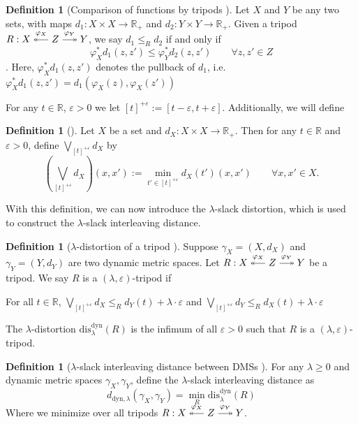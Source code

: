 \documentclass[a4paper,UKenglish,thm-restate]{article}
\theoremstyle{definition}
\newtheorem{definition}[theorem]{Definition}
\DeclareRobustCommand\longtwoheadrightarrow
     {\relbar\joinrel\twoheadrightarrow}
\DeclareRobustCommand\longtwoheadleftarrow
     {\twoheadleftarrow\joinrel\relbar}
\begin{document}
\begin{appendices}
        \begin{definition}[Comparison of functions by tripods \cite{stablesignatures}]
            Let $X$ and $Y$ be any two sets, with maps $d_1: X \times X \rightarrow \mathbb{R}_{+}$ and $d_2: Y \times Y \rightarrow \mathbb{R}_{+}$. Given a tripod $R: X \overset{\varphi_X}{\longtwoheadleftarrow} Z \overset{\varphi_Y}{\longtwoheadrightarrow} Y$, we say $d_1 \leq_{R} d_2$ if and only if \[\varphi_X^{*} d_1(z, z') \leq \varphi_Y^{*} d_2(z, z') \qquad \forall z, z' \in Z\]. Here, $\varphi_X^{*} d_1(z, z')$ denotes the pullback of $d_1$, i.e. $\varphi_X^{*} d_1(z, z') = d_1(\varphi_X(z), \varphi_X(z'))$
        \end{definition}
        For any $t \in \mathbb{R}$, $\varepsilon > 0$ we let $[t]^{+\varepsilon} := [t - \varepsilon, t + \varepsilon]$. Additionally, we will define
        \begin{definition}[\cite{stablesignatures}]
            Let $X$ be a set and $d_X: X \times X \rightarrow \mathbb{R}_+$. Then for any $t \in \mathbb{R}$ and $\varepsilon > 0$, define $\bigvee_{[t]^{+\varepsilon}} d_X$ by \[\left(\bigvee_{[t]^{+\varepsilon}} d_X\right)(x, x') := \min_{t' \in [t]^{+\varepsilon}} d_X(t')(x, x') \qquad \forall x, x' \in X.\]
        \end{definition}
        With this definition, we can now introduce the $\lambda$-slack distortion, which is used to construct the $\lambda$-slack interleaving distance.
        \begin{definition}[$\lambda$-distortion of a tripod \cite{stablesignatures}]
            Suppose $\gamma_X = (X, d_X)$ and $\gamma_Y = (Y, d_Y)$ are two dynamic metric spaces. Let $R: X \overset{\varphi_X}{\longtwoheadleftarrow} Z \overset{\varphi_Y}{\longtwoheadrightarrow} Y$ be a tripod. We say $R$ is a $(\lambda, \varepsilon)$-tripod if
            \begin{center}
                For all $t \in \mathbb{R}$, $\bigvee_{[t]^{+\varepsilon}} d_X \leq_{R} d_Y(t) + \lambda \cdot \varepsilon$ and $\bigvee_{[t]^{+\varepsilon}} d_Y \leq_{R} d_X(t) + \lambda \cdot \varepsilon$
            \end{center}
            The $\lambda$-distortion $\mathrm{dis}_\lambda^{\mathrm{dyn}}(R)$ is the infimum of all $\varepsilon > 0$ such that $R$ is a $(\lambda, \varepsilon)$-tripod.
        \end{definition}
    
        \begin{definition}[$\lambda$-slack interleaving distance between DMSs \cite{stablesignatures}] \label{def:slackinterleaving}
            For any $\lambda \geq 0$ and dynamic metric spaces $\gamma_X, \gamma_Y$, define the $\lambda$-slack interleaving distance as
            \[d_{\mathrm{dyn}, \lambda}(\gamma_X, \gamma_Y) = \min_{R} \text{dis}_\lambda^{\text{dyn}}(R)\]
            Where we minimize over all tripods $R: X \overset{\varphi_X}{\longtwoheadleftarrow} Z \overset{\varphi_Y}{\longtwoheadrightarrow} Y$.
        \end{definition}


\end{appendices}
\end{document}
